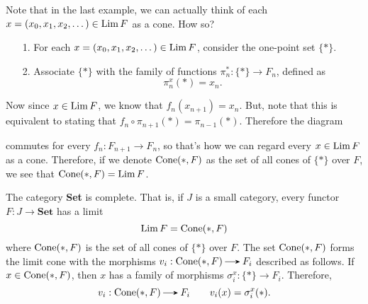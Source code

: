     Note that in the last example, we can
    actually think of each $x = (x_0, x_1, x_2, \dots)
    \in \operatorname*{\mathrm{Lim }} F$ as a cone. How so? 
    \begin{itemize}
        \item[1.] For each $x = (x_0, x_1, x_2, \dots) \in \operatorname*{\mathrm{Lim }} F$, 
        consider the one-point set $\{*\}$.
        
        \item[2.] Associate $\{*\}$ with 
        the family of functions $\pi^*_n: \{*\} \to F_n$, defined as
        \[
            \pi^x_n(*) = x_n.
        \] 
    \end{itemize}
    Now since $x \in \operatorname*{\mathrm{Lim }} F$, we know that $f_n(x_{n+1}) = x_{n}$.
    But, note that this is equivalent to stating that $f_n \circ
    \pi_{n+1}(*) = \pi_{n-1}(*)$. Therefore the diagram 
    \begin{center}
    \end{center}
    commutes for every $f_n: F_{n+1} \to F_n$, so that's how we can
    regard every $x \in \operatorname*{\mathrm{Lim }} F$ as a cone.
    Therefore, if we denote $\operatorname{\mathrm{Cone}}(*, F)$ as the set of all cones of
    $\{*\}$ over $F$, we see that $\operatorname{\mathrm{Cone}}(*, F) = \operatorname*{\mathrm{Lim }} F$. 
    \begin{thm}
        The category \textbf{Set} is complete. That is, if $J$ is a
        small category, every functor $F: J \to \textbf{Set}$ has a 
        limit 
        \[
            \operatorname*{\mathrm{Lim }} F = \operatorname{\mathrm{Cone}}(*, F)
        \]
        where $\operatorname{\mathrm{Cone}}(*, F)$ is the set of all cones of $\{*\}$ over
        $F$. The set $\operatorname{\mathrm{Cone}}(*, F)$ forms the limit cone with the
        morphisms $v_i: \cone(*, F) \to F_i$ described as follows.
        If $x \in \operatorname{\mathrm{Cone}}(*, F)$, then $x$ has a family of 
        morphisms $\sigma^x_i: \{*\} \to F_i$. Therefore,
        \[
            v_i: \cone(*, F) \to F_i \qquad v_i(x) = \sigma^x_i(*).
        \]
        \vspace{-0.8cm}
    \end{thm}


